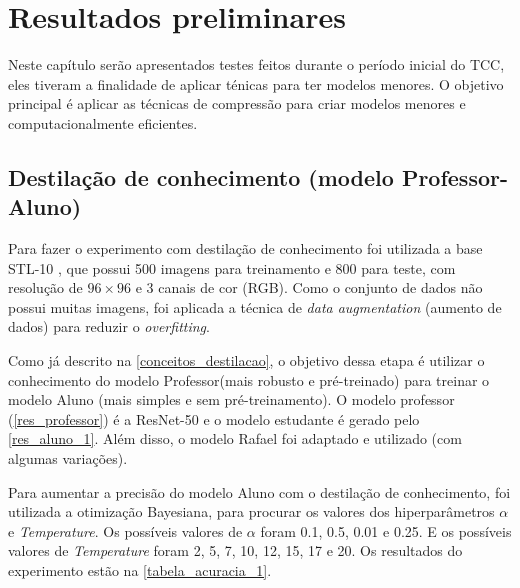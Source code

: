 \chapter{Resultados preliminares}

Neste capítulo serão apresentados testes feitos durante o período inicial do TCC, eles tiveram a finalidade de aplicar ténicas para ter modelos menores.
O objetivo principal é aplicar as técnicas de compressão para criar modelos menores e computacionalmente eficientes.

\section{Destilação de conhecimento (modelo Professor-Aluno)}
Para fazer o experimento com destilação de conhecimento foi utilizada a base STL-10 \cite{stl10}, que possui 500 imagens para
treinamento e 800 para teste, com resolução de $96 \times 96$ e 3 canais de cor (RGB). Como o conjunto de dados
não possui muitas imagens, foi aplicada a técnica de \textit{data augmentation} (aumento de dados) para reduzir o
\textit{overfitting}.

Como já descrito na \autoref{conceitos_destilacao}, o objetivo dessa etapa é utilizar o conhecimento do modelo
Professor(mais robusto e pré-treinado) para treinar o modelo Aluno (mais simples e sem pré-treinamento).
O modelo professor (\autoref{res_professor}) é a ResNet-50  \cite{resnet} e o modelo estudante é gerado pelo
\autoref{res_aluno_1}.
Além disso, o modelo Rafael \cite{rafael} foi adaptado e utilizado (com algumas variações).

Para aumentar a precisão do modelo Aluno com o destilação de conhecimento, foi utilizada a otimização
Bayesiana, para procurar os valores dos hiperparâmetros $\alpha$ e \textit{Temperature}.
Os possíveis valores de $\alpha$ foram 0.1, 0.5, 0.01 e 0.25.
E os possíveis valores de \textit{Temperature} foram 2, 5, 7, 10, 12, 15, 17 e 20.
Os resultados do experimento estão na \autoref{tabela_acuracia_1}.

